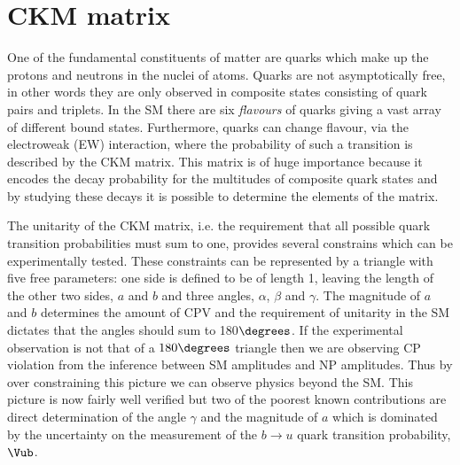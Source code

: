\documentclass[a4paper, 10pt]{article}
\begin{document}

\section*{CKM matrix}

One of the fundamental constituents of matter are quarks which make up the protons and neutrons in the nuclei of atoms. Quarks are not asymptotically free, in other words they are only
observed in composite states consisting of quark pairs and triplets. In the SM there are six \textit{flavours} of quarks giving a vast array of different bound states. Furthermore, quarks can change flavour, via the electroweak (EW) interaction, where 
the probability of such a transition is described by
the CKM matrix. This matrix is of huge importance because it encodes the decay probability for the multitudes of composite quark states and by studying these decays it is possible to determine the elements of the matrix.

The unitarity of the CKM matrix, i.e. the requirement that all possible quark transition probabilities must sum to one, provides several constrains which can be experimentally tested. 
These constraints can be represented by a triangle with five free parameters: one side is defined to be of length 1, leaving the length of the other two sides, $a$ and $b$ and three angles, $\alpha$, $\beta$ and $\gamma$. The magnitude of $a$ and $b$
determines the amount of CPV and the requirement of unitarity in the SM dictates that the angles should sum to 180$\degrees$.
If the experimental observation is not that of a $180\degrees$ triangle then we are observing CP violation 
from the inference between SM amplitudes and NP amplitudes. Thus by over constraining this picture we can observe physics beyond the SM. 
This picture is now fairly well verified but two of the poorest known contributions are direct determination of the angle $\gamma$ and the magnitude of $a$ which is dominated by the uncertainty on the measurement of the $b\to u$ quark transition
probability, $\Vub$.

\end{document}

